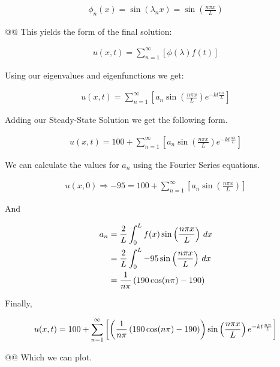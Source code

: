 \documentclass[10pt]{article}
\begin{document}
\begin{easylist}[enumerate]
    \begin{align*}
        \phi_n(x) = \sin\left(\lambda_n x\right) = \sin\left(\frac{n\pi x}{L}\right)
    \end{align*}

    @@ This yields the form of the final solution:

    \begin{align*}
        u(x, t) = \sum_{n=1}^\infty \left[ \phi\left(\lambda\right) f(t)\right] 
    \end{align*}

    Using our eigenvalues and eigenfunctions we get:

    \begin{align*}
        u(x, t) = \sum_{n=1}^\infty \left[ a_n \sin\left(\frac{n\pi x}{L}\right) e^{-kt\frac{n\pi}{L}}\right] 
    \end{align*}

    Adding our Steady-State Solution we get the following form.

    \begin{align*}
        u(x, t) = 100 + \sum_{n=1}^\infty \left[ a_n \sin\left(\frac{n\pi x}{L}\right) e^{-kt\frac{n\pi}{L}}\right] 
    \end{align*}

    We can calculate the values for $a_n$ using the Fourier Series equations.

    \begin{align*}
        u(x, 0) \Rightarrow -95 = 100 + \sum_{n=1}^\infty \left[ a_n \sin\left(\frac{n\pi x}{L}\right)\right]
    \end{align*}

    And

    \begin{align*}
        a_n &= \frac{2}{L} \int_0^L f(x) \sin\left(\frac{n\pi x}{L}\right) \, dx\\
        &= \frac{2}{L} \int_0^L -95 \sin\left(\frac{n\pi x}{L}\right) \, dx\\
        &= \frac{1}{n\pi} \left( 190 \cos(n\pi) - 190 \right)
    \end{align*}

    Finally,

    \begin{align*}
        u(x, t) = 100 + \sum_{n=1}^\infty \left[ \left( \frac{1}{n\pi} \left( 190 \cos(n\pi) - 190 \right) \right) \sin\left(\frac{n\pi x}{L}\right) e^{-kt\frac{n\pi}{L}}\right] 
    \end{align*}

    @@ Which we can plot.


\end{easylist}
\end{document}
